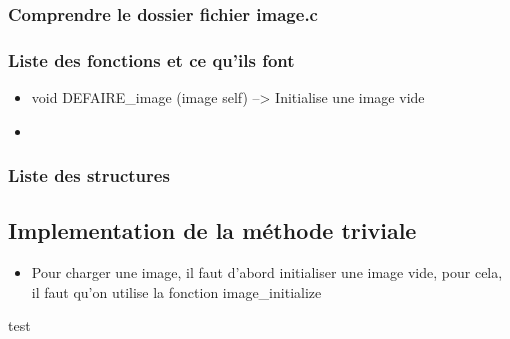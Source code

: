 \documentclass[10pt,a4paper]{article}
\begin{document}
\subsubsection{Comprendre le dossier fichier image.c}
\subsubsection{Liste des fonctions et ce qu'ils font}

\begin{itemize}
\item void DEFAIRE\_image (image self) --> Initialise une image vide
\item 
\end{itemize}
\subsubsection{Liste des structures}
\subsection{Implementation de la méthode triviale}
\begin{itemize}
\item Pour charger une image, il faut d'abord initialiser une image vide, pour cela, il faut qu'on utilise la fonction image\_initialize
\end{itemize}
test
\end{document}
